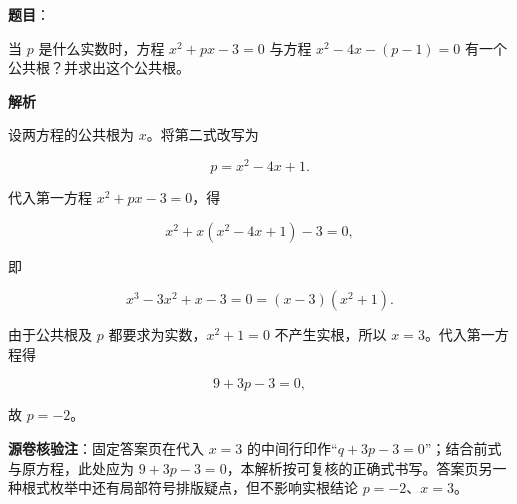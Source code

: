 \begin{answer}

\textbf{题目}：

当 $p$ 是什么实数时，方程 $x^2+px-3=0$ 与方程 $x^2-4x-(p-1)=0$ 有一个公共根？并求出这个公共根。

\textbf{解析}

设两方程的公共根为 $x$。将第二式改写为

\nopagebreak[4]
\[p=x^2-4x+1.\]

代入第一方程 $x^2+px-3=0$，得

\nopagebreak[4]
\[x^2+x(x^2-4x+1)-3=0,\]

即

\nopagebreak[4]
\[x^3-3x^2+x-3=0=(x-3)(x^2+1).\]

由于公共根及 $p$ 都要求为实数，$x^2+1=0$ 不产生实根，所以 $x=3$。代入第一方程得

\nopagebreak[4]
\[9+3p-3=0,\]

故 $p=-2$。

\begin{gktip}
\textbf{源卷核验注}：固定答案页在代入 $x=3$ 的中间行印作“$q+3p-3=0$”；结合前式与原方程，此处应为 $9+3p-3=0$，本解析按可复核的正确式书写。答案页另一种根式枚举中还有局部符号排版疑点，但不影响实根结论 $p=-2$、$x=3$。
\end{gktip}


\end{answer}
